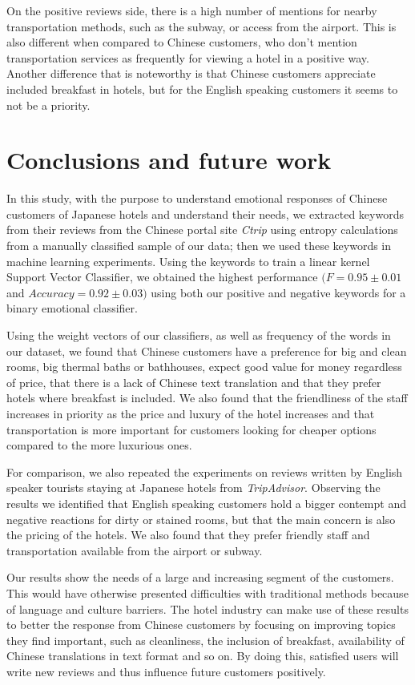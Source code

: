 \documentclass[review]{elsarticle}
\begin{document}
On the positive reviews side, there is a high number of mentions for nearby transportation methods, such as the subway, or access from the airport. This is also different when compared to Chinese customers, who don't mention transportation services as frequently for viewing a hotel in a positive way. Another difference that is noteworthy is that Chinese customers appreciate included breakfast in hotels, but for the English speaking customers it seems to not be a priority.

\section{Conclusions and future work}\label{conclusions}

In this study, with the purpose to understand emotional responses of Chinese customers of Japanese hotels and understand their needs, we extracted keywords from their reviews from the Chinese portal site \textit{Ctrip} using entropy calculations from a manually classified sample of our data; then we used these keywords in machine learning experiments. Using the keywords to train a linear kernel Support Vector Classifier, we obtained the highest performance \((F=0.95\pm0.01\) and \(Accuracy = 0.92\pm0.03)\) using both our positive and negative keywords for a binary emotional classifier.

Using the weight vectors of our classifiers, as well as frequency of the words in our dataset, we found that Chinese customers have a preference for big and clean rooms, big thermal baths or bathhouses, expect good value for money regardless of price, that there is a lack of Chinese text translation and that they prefer hotels where breakfast is included. We also found that the friendliness of the staff increases in priority as the price and luxury of the hotel increases and that transportation is more important for customers looking for cheaper options compared to the more luxurious ones.

For comparison, we also repeated the experiments on reviews written by English speaker tourists staying at Japanese hotels from \textit{TripAdvisor}. Observing the results we identified that English speaking customers hold a bigger contempt and negative reactions for dirty or stained rooms, but that the main concern is also the pricing of the hotels. We also found that they prefer friendly staff and transportation available from the airport or subway.

Our results show the needs of a large and increasing segment of the customers. This would have otherwise presented difficulties with traditional methods because of language and culture barriers. The hotel industry can make use of these results to better the response from Chinese customers by focusing on improving topics they find important, such as cleanliness, the inclusion of breakfast, availability of Chinese translations in text format and so on. By doing this, satisfied users will write new reviews and thus influence future customers positively.
\end{document}
